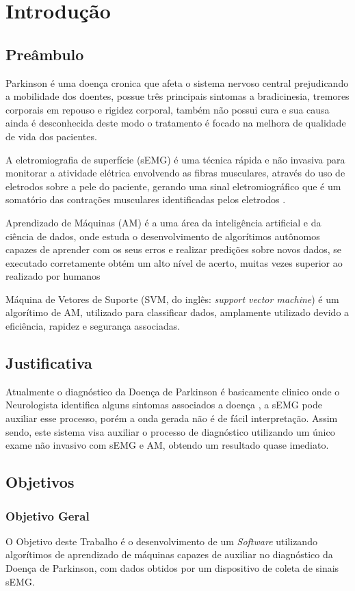 \chapter[Introdução]{Introdução}
\section{Preâmbulo}
Parkinson é uma doença cronica que afeta o sistema nervoso central prejudicando a mobilidade dos doentes, possue três principais sintomas a bradicinesia, tremores corporais em repouso e rigidez corporal, também não possui cura e sua causa ainda é desconhecida deste modo o tratamento é focado na melhora de qualidade de vida dos pacientes\cite{da2016aspectos}.

A eletromiografia de superfície (sEMG) é uma técnica rápida e não invasiva para monitorar a atividade elétrica envolvendo as fibras musculares, através do uso de eletrodos sobre a pele do paciente, gerando uma sinal eletromiográfico que é um somatório das contrações musculares identificadas pelos eletrodos \cite{de2010eletromiografia}.

Aprendizado de Máquinas (AM) é a uma área da inteligência artificial e da ciência de dados, onde estuda o desenvolvimento de algorítimos autônomos capazes de aprender com os seus erros e realizar predições sobre novos dados, se executado corretamente obtém um alto nível de acerto, muitas vezes superior ao realizado por humanos \cite{Kohavi}

Máquina de Vetores de Suporte (SVM, do inglês: \textit{support vector machine}) é um algorítimo de AM, utilizado para classificar dados, amplamente utilizado devido a eficiência, rapidez e segurança associadas.

\section{Justificativa}
Atualmente o diagnóstico da Doença de Parkinson é basicamente clinico onde o Neurologista identifica alguns sintomas associados a doença \cite{gago2014manual}, a sEMG pode auxiliar esse processo, porém a onda gerada não é de fácil interpretação. Assim sendo, este sistema visa auxiliar o processo de diagnóstico utilizando um único exame não invasivo com sEMG e AM, obtendo um resultado quase imediato.

\section{Objetivos}
\subsection{Objetivo Geral}
O Objetivo deste Trabalho é o desenvolvimento de um \textit{Software} utilizando algorítimos de aprendizado de máquinas capazes de auxiliar no diagnóstico da Doença de Parkinson, com dados obtidos por um dispositivo de coleta de sinais sEMG.

